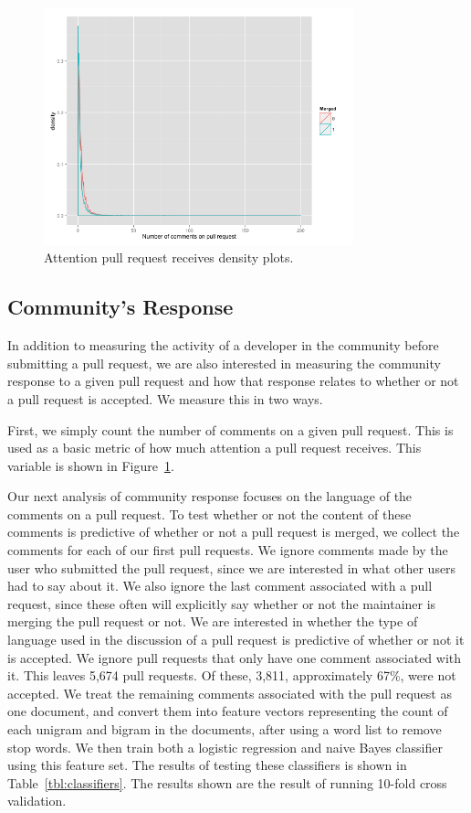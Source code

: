 \documentclass{sigchi}
\begin{document}
\begin{figure}[p] \centering
\includegraphics[width=0.8\textwidth]{figures/comments_on_pr_density_ggplot.png}
\caption{Attention pull request receives density plots.} \label{fig:aprr}
\end{figure}

\subsection{Community's Response} In addition to measuring the activity of a
developer in the community before submitting a pull request, we are also
interested in measuring the community response to a given pull request and how
that response relates to whether or not a pull request is accepted. We measure
this in two ways.

First, we simply count the number of comments on a given pull request. This is
used as a basic metric of how much attention a pull request receives. This
variable is shown in Figure~\ref{fig:aprr}.

Our next analysis of community response focuses on the language of the comments
on a pull request. To test whether or not the content of these comments is
predictive of whether or not a pull request is merged, we collect the comments
for each of our first pull requests. We ignore comments made by the user who
submitted the pull request, since we are interested in what other users had to
say about it. We also ignore the last comment associated with a pull request,
since these often will explicitly say whether or not the maintainer is merging
the pull request or not. We are interested in whether the type of language used
in the discussion of a pull request is predictive of whether or not it is
accepted. We ignore pull requests that only have one comment associated with it.
This leaves 5,674 pull requests. Of these, 3,811, approximately 67\%, were not
accepted. We treat the remaining comments associated with the pull request as
one document, and convert them into feature vectors representing the count of
each unigram and bigram in the documents, after using a word list to remove stop
words. We then train both a logistic regression and naive Bayes classifier using
this feature set. The results of testing these classifiers is shown in
Table~\ref{tbl:classifiers}. The results shown are the result of running 10-fold
cross validation.
\end{document}
